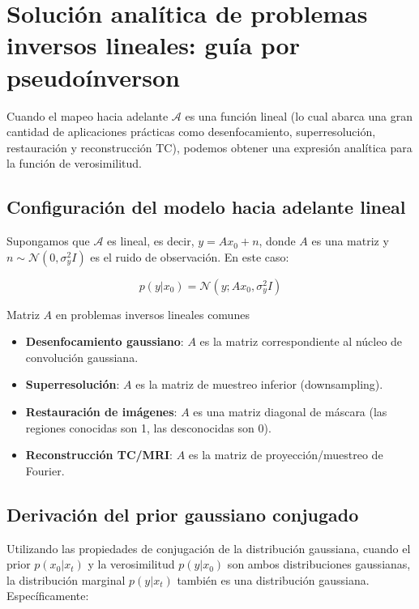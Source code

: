 \documentclass[a4paper]{article}
\begin{document}
\section{Solución analítica de problemas inversos lineales: guía por pseudoínverson}

Cuando el mapeo hacia adelante $\mathcal{A}$ es una función lineal (lo cual abarca una gran cantidad de aplicaciones prácticas como desenfocamiento, superresolución, restauración y reconstrucción TC), podemos obtener una expresión analítica para la función de verosimilitud.

\subsection{Configuración del modelo hacia adelante lineal}

Supongamos que $\mathcal{A}$ es lineal, es decir, $y = A x_0 + n$, donde $A$ es una matriz y $n \sim \mathcal{N}(0, \sigma_y^2 I)$ es el ruido de observación. En este caso:

$$
p(y | x_0) = \mathcal{N}(y; A x_0, \sigma_y^2 I)
$$

\begin{knowledgebox}{Matriz $A$ en problemas inversos lineales comunes}
\begin{itemize}
    \item \textbf{Desenfocamiento gaussiano}: $A$ es la matriz correspondiente al núcleo de convolución gaussiana.
    \item \textbf{Superresolución}: $A$ es la matriz de muestreo inferior (downsampling).
    \item \textbf{Restauración de imágenes}: $A$ es una matriz diagonal de máscara (las regiones conocidas son 1, las desconocidas son 0).
    \item \textbf{Reconstrucción TC/MRI}: $A$ es la matriz de proyección/muestreo de Fourier.
\end{itemize}
\end{knowledgebox}

\subsection{Derivación del prior gaussiano conjugado}

Utilizando las propiedades de conjugación de la distribución gaussiana, cuando el prior $p(x_0 | x_t)$ y la verosimilitud $p(y|x_0)$ son ambos distribuciones gaussianas, la distribución marginal $p(y | x_t)$ también es una distribución gaussiana. Específicamente:
\end{document}
